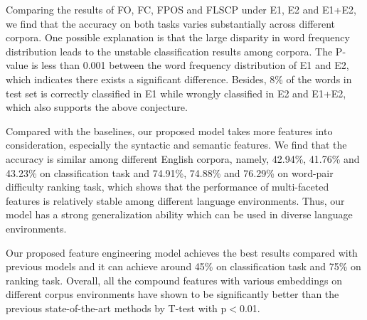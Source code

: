 
Comparing the results of FO, FC, FPOS and FLSCP under E1, E2 and E1+E2, 
we find that the accuracy on both tasks varies substantially
across different corpora.
One possible explanation is that the large disparity in word frequency distribution leads to the unstable classification results among corpora. 
The P-value is less than 0.001 between the word frequency distribution of 
E1 and E2, which indicates there exists a significant difference.
Besides, 8\% of the words in test set is correctly classified in E1 while wrongly classified in E2 and E1+E2, which also supports the above conjecture.

Compared with the baselines, our proposed model takes more features 
into consideration, especially the syntactic and semantic features.
We find that the accuracy is similar among different English corpora,
namely, 42.94\%, 41.76\% and 43.23\% on classification task and 74.91\%, 74.88\% and 76.29\% on word-pair difficulty ranking task,
which shows that the performance of  multi-faceted features 
is relatively stable among different language environments.
Thus, our model has a strong generalization ability which can 
be used in diverse language environments.
	
Our proposed feature engineering model achieves the best results compared with previous models and it can achieve around 45\% on classification task and 75\% on ranking task.
Overall, all the compound features with various embeddings on different corpus environments have shown to be significantly better than the previous state-of-the-art methods by T-test with p$<$0.01.

